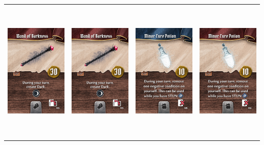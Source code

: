 \documentclass{minimal}
\begin{document}
{\begin{longtable}{llll}
\includegraphics[width=44mm,height=68mm]{./64-151/gh-088b-wand-of-darkness.png} &
\includegraphics[width=44mm,height=68mm]{./64-151/gh-088b-wand-of-darkness.png} &
\includegraphics[width=44mm,height=68mm]{./64-151/gh-089a-minor-cure-potion.png} &
\includegraphics[width=44mm,height=68mm]{./64-151/gh-089b-minor-cure-potion.png}\\ 

\end{longtable}}
\end{document}
